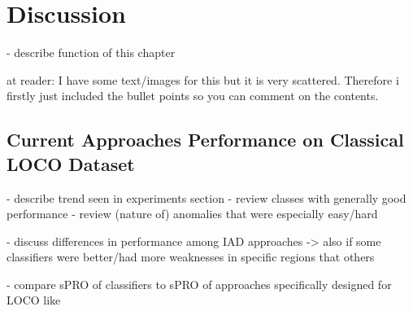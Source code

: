 \chapter{Discussion}
\label{chap:results}

- describe function of this chapter\newline

at reader: I have some text/images for this but it is very scattered. Therefore i firstly just included the bullet points so you can comment on the contents.\newline


\section{Current Approaches Performance on Classical LOCO Dataset}
\label{sec:locoresultssota}

- describe trend seen in experiments section\newline
- review classes with generally good performance\newline
- review (nature of) anomalies that were especially easy/hard\newline

- discuss differences in performance among IAD approaches\newline
-> also if some classifiers were better/had more weaknesses in specific regions that others\newline

- compare sPRO of classifiers to sPRO of approaches specifically designed for LOCO like \cite{LOCODentsAndScratchesBergmann2022}\newline

